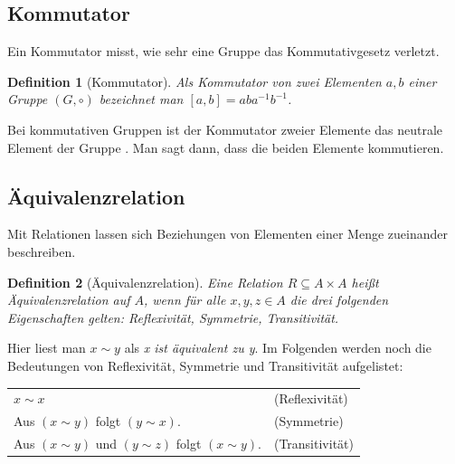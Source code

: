\documentclass[12pt,a4paper, usenames, dvipsnames]{article}
\newtheorem{definition}{Definition}
\begin{document}
\subsection*{Kommutator} 
Ein Kommutator misst, wie sehr eine Gruppe das Kommutativgesetz verletzt. 
\begin{singlespacing}
\begin{definition}[Kommutator]
Als Kommutator von zwei Elementen $a, b$ einer Gruppe $(G, \circ)$  bezeichnet man $[a,b] = aba^{-1}b^{-1}$.
\end{definition}
\end{singlespacing}
Bei kommutativen Gruppen ist der Kommutator zweier Elemente das neutrale Element der Gruppe \cite{TD}. Man sagt dann, dass die beiden Elemente kommutieren. 


%
%
%
%
%
%
%
%
%
%
%
%
%

\subsection*{Äquivalenzrelation} 

Mit Relationen lassen sich Beziehungen von Elementen einer Menge zueinander beschreiben.
\begin{singlespacing}
\begin{definition}[Äquivalenzrelation]
Eine Relation $R \subseteq A \times A$ heißt Äquivalenzrelation auf $A$, wenn für alle $x, y, z \in A$ die drei folgenden Eigenschaften gelten: Reflexivität, Symmetrie, Transitivität.
\end{definition}
\end{singlespacing}

Hier liest man $x \sim y$ als \textit{x ist äquivalent zu y}. Im Folgenden werden noch die Bedeutungen von Reflexivität, Symmetrie und Transitivität aufgelistet:

\begin{center}
\begin{tabular}{ll}
$x \sim x$ & (Reflexivität) \\
Aus $(x \sim y)$ folgt $(y \sim x)$. & (Symmetrie) \\
Aus $(x \sim y)$ und $(y \sim z)$ folgt $(x \sim y)$. & (Transitivität) \\
\end{tabular}
\end{center}
\end{document}
